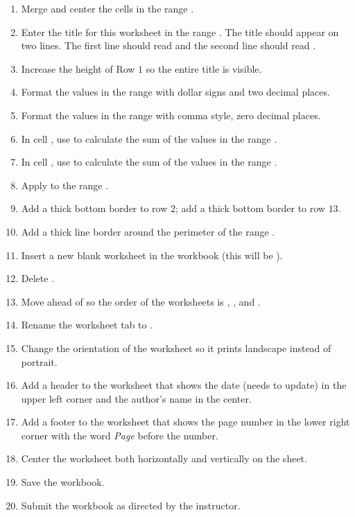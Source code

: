 \begin{enumerate}
	\item Merge and center the cells in the range .
	\item Enter the title for this worksheet in the range . The title should appear on two lines. The first line should read  and the second line should read .
	\item Increase the height of Row $ 1 $ so the entire title is visible.
	\item Format the values in the range  with dollar signs and two decimal places.
	\item Format the values in the range  with comma style, zero decimal places.
	\item In cell , use  to calculate the sum of the values in the range .
	\item In cell , use  to calculate the sum of the values in the range .
	\item Apply  to the range .
	\item Add a thick bottom border to row $ 2 $; add a thick bottom border to row $ 13 $.
	\item Add a thick line border around the perimeter of the range .
	\item Insert a new blank worksheet in the workbook (this will be ).
	\item Delete .
	\item Move  ahead of  so the order of the worksheets is , , and .
	\item Rename the  worksheet tab to .
	\item Change the orientation of the  worksheet so it prints landscape instead of portrait.
	\item Add a header to the  worksheet that shows the date (needs to update) in the upper left corner and the author's name in the center.
	\item Add a footer to the  worksheet that shows the page number in the lower right corner with the word \textit{Page} before the number.
	\item Center the worksheet both horizontally and vertically on the sheet.
	\item Save the  workbook.
	\item Submit the  workbook as directed by the instructor.

\end{enumerate}
